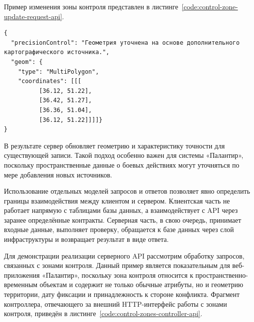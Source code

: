 Пример изменения зоны контроля представлен в листинге~\ref{code:control-zone-update-request-api}.

\begin{code}
\label{code:control-zone-update-request-api}
\vspace{-0.75cm}
\begin{verbatim}
{
  "precisionControl": "Геометрия уточнена на основе дополнительного картографического источника.",
  "geom": {
    "type": "MultiPolygon",
    "coordinates": [[[
          [36.12, 51.22],
          [36.42, 51.27],
          [36.36, 51.04],
          [36.12, 51.22]]]]}
}
\end{verbatim}
\end{code}

В результате сервер обновляет геометрию и характеристику точности для существующей записи. Такой подход особенно важен для системы «Палантир», поскольку пространственные данные о боевых действиях могут уточняться по мере добавления новых источников.

Использование отдельных моделей запросов и ответов позволяет явно определить границы взаимодействия между клиентом и сервером. Клиентская часть не работает напрямую с таблицами базы данных, а взаимодействует с API через заранее определённые контракты. Серверная часть, в свою очередь, принимает входные данные, выполняет проверку, обращается к базе данных через слой инфраструктуры и возвращает результат в виде ответа.

Для демонстрации реализации серверного API рассмотрим обработку запросов, связанных с зонами контроля. Данный пример является показательным для веб-приложения «Палантир», поскольку зона контроля относится к пространственно-временным объектам и содержит не только обычные атрибуты, но и геометрию территории, дату фиксации и принадлежность к стороне конфликта. Фрагмент контроллера, отвечающего за внешний HTTP-интерфейс работы с зонами контроля, приведён в листинге~\ref{code:control-zones-controller-api}.

